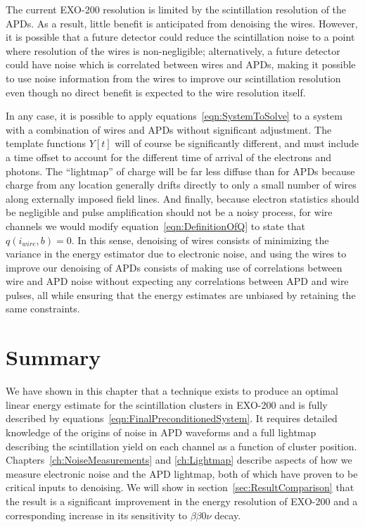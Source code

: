 The current EXO-200 resolution is limited by the scintillation resolution of the APDs.  As a result, little benefit is anticipated from denoising the wires.  However, it is possible that a future detector could reduce the scintillation noise to a point where resolution of the wires is non-negligible; alternatively, a future detector could have noise which is correlated between wires and APDs, making it possible to use noise information from the wires to improve our scintillation resolution even though no direct benefit is expected to the wire resolution itself.

In any case, it is possible to apply equations~\ref{eqn:SystemToSolve} to a system with a combination of wires and APDs without significant adjustment.  The template functions $Y[t]$ will of course be significantly different, and must include a time offset to account for the different time of arrival of the electrons and photons.  The ``lightmap'' of charge will be far less diffuse than for APDs because charge from any location generally drifts directly to only a small number of wires along externally imposed field lines.  And finally, because electron statistics should be negligible and pulse amplification should not be a noisy process, for wire channels we would modify equation~\ref{eqn:DefinitionOfQ} to state that $q(i_{wire}, b) = 0$.  In this sense, denoising of wires consists of minimizing the variance in the energy estimator due to electronic noise, and using the wires to improve our denoising of APDs consists of making use of correlations between wire and APD noise without expecting any correlations between APD and wire pulses, all while ensuring that the energy estimates are unbiased by retaining the same constraints.

\section{Summary}

We have shown in this chapter that a technique exists to produce an optimal linear energy estimate for the scintillation clusters in EXO-200 and is fully described by equations~\ref{eqn:FinalPreconditionedSystem}.  It requires detailed knowledge of the origins of noise in APD waveforms and a full lightmap describing the scintillation yield on each channel as a function of cluster position.  Chapters~\ref{ch:NoiseMeasurements} and \ref{ch:Lightmap} describe aspects of how we measure electronic noise and the APD lightmap, both of which have proven to be critical inputs to denoising.  We will show in section~\ref{sec:ResultComparison} that the result is a significant improvement in the energy resolution of EXO-200 and a corresponding increase in its sensitivity to $\beta\beta 0\nu$ decay.
